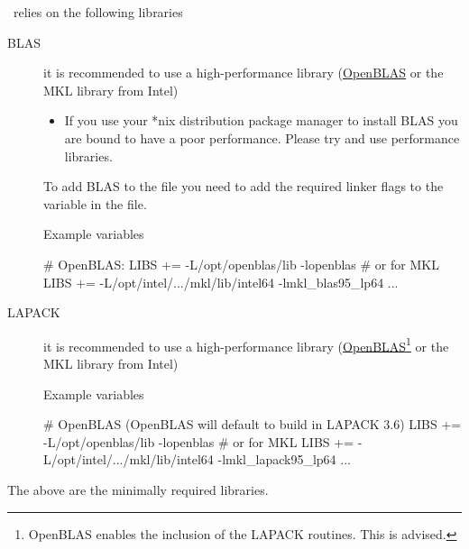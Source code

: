 \tbtrans\ relies on the following libraries
\begin{description}
  \item[BLAS] %
  it is recommended to use a high-performance library
  (\href{https://github.com/xianyi/OpenBLAS}{OpenBLAS} or the MKL
  library from Intel)
  
  \begin{itemize}
    \item If you use your *nix distribution package manager to install
    BLAS you are bound to have a poor performance. Please try and use
    performance libraries.
  \end{itemize}

  To add BLAS to the  file you need to add the
  required linker flags to the  variable in the
   file.

  Example variables
\begin{shellexample}
  # OpenBLAS:
  LIBS += -L/opt/openblas/lib -lopenblas
  # or for MKL
  LIBS += -L/opt/intel/.../mkl/lib/intel64 -lmkl_blas95_lp64 ...
\end{shellexample}

  \item[LAPACK]%
  it is recommended to use a high-performance library
  (\href{https://github.com/xianyi/OpenBLAS}{OpenBLAS}\footnote{OpenBLAS
      enables the inclusion of the LAPACK routines. This is advised.}
  or the MKL library from Intel)

  Example variables
\begin{shellexample}
  # OpenBLAS (OpenBLAS will default to build in LAPACK 3.6)
  LIBS += -L/opt/openblas/lib -lopenblas
  # or for MKL
  LIBS += -L/opt/intel/.../mkl/lib/intel64 -lmkl_lapack95_lp64 ...
\end{shellexample}

\end{description}

The above are the minimally required libraries. 


